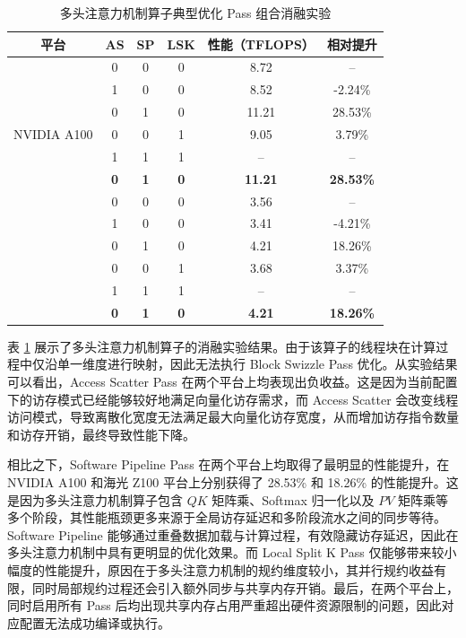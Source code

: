 \begin{table}[htbp]
\caption{多头注意力机制算子典型优化 Pass 组合消融实验}
\label{tab:mha_pass_ablation}
\vspace{0.5em}\centering\wuhao
\begin{tabular}{cccccc}
\toprule[1.5pt]
平台 & AS & SP & LSK & 性能（TFLOPS） & 相对提升 \\
\midrule[1pt]
\multirow{7}{*}{NVIDIA A100}
& 0 & 0 & 0 & 8.72 & -- \\
& 1 & 0 & 0 & 8.52 & -2.24\% \\
& 0 & 1 & 0 & 11.21 & 28.53\% \\
& 0 & 0 & 1 & 9.05 & 3.79\% \\
& 1 & 1 & 1 & -- & -- \\
& \textbf{0} & \textbf{1} & \textbf{0} & \textbf{11.21} & \textbf{28.53\%} \\
\multirow{7}{*}{海光 Z100}
& 0 & 0 & 0 & 3.56 & -- \\
& 1 & 0 & 0 & 3.41 & -4.21\% \\
& 0 & 1 & 0 & 4.21 & 18.26\% \\
& 0 & 0 & 1 & 3.68 & 3.37\% \\
& 1 & 1 & 1 & -- & -- \\
& \textbf{0} & \textbf{1} & \textbf{0} & \textbf{4.21} & \textbf{18.26\%} \\
\bottomrule[1.5pt]
\end{tabular}
\vspace{\baselineskip}
\end{table}

表 \ref{tab:mha_pass_ablation} 展示了多头注意力机制算子的消融实验结果。由于该算子的线程块在计算过程中仅沿单一维度进行映射，因此无法执行 Block Swizzle Pass 优化。从实验结果可以看出，Access Scatter Pass 在两个平台上均表现出负收益。这是因为当前配置下的访存模式已经能够较好地满足向量化访存需求，而 Access Scatter 会改变线程访问模式，导致离散化宽度无法满足最大向量化访存宽度，从而增加访存指令数量和访存开销，最终导致性能下降。

相比之下，Software Pipeline Pass 在两个平台上均取得了最明显的性能提升，在 NVIDIA A100 和海光 Z100 平台上分别获得了 28.53\% 和 18.26\% 的性能提升。这是因为多头注意力机制算子包含 $QK$ 矩阵乘、Softmax 归一化以及 $PV$ 矩阵乘等多个阶段，其性能瓶颈更多来源于全局访存延迟和多阶段流水之间的同步等待。Software Pipeline 能够通过重叠数据加载与计算过程，有效隐藏访存延迟，因此在多头注意力机制中具有更明显的优化效果。而 Local Split K Pass 仅能够带来较小幅度的性能提升，原因在于多头注意力机制的规约维度较小，其并行规约收益有限，同时局部规约过程还会引入额外同步与共享内存开销。最后，在两个平台上，同时启用所有 Pass 后均出现共享内存占用严重超出硬件资源限制的问题，因此对应配置无法成功编译或执行。


